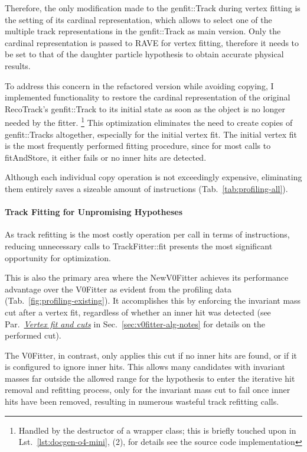 Therefore, the only modification made to the genfit::Track during vertex fitting is the setting of its cardinal representation, which allows to select one of the multiple track representations in the genfit::Track as main version.
Only the cardinal representation is passed to RAVE for vertex fitting, therefore it needs to be set to that of the daughter particle hypothesis to obtain accurate physical results.

To address this concern in the refactored version while avoiding copying, I implemented functionality to restore the cardinal representation of the original RecoTrack's genfit::Track to its initial state as soon as the object is no longer needed by the fitter.%
\footnote{
  Handled by the destructor of a wrapper class; this is briefly touched upon in Lst.\ \ref{lst:docgen-o4-mini}, (2), for details see the source code implementation
}
This optimization eliminates the need to create copies of genfit::Tracks altogether, especially for the initial vertex fit.
The initial vertex fit is the most frequently performed fitting procedure, since for most calls to fitAndStore, it either fails or no inner hits are detected.

Although each individual copy operation is not exceedingly expensive, eliminating them entirely saves a sizeable amount of instructions (Tab.\ \ref{tab:profiling-all}).

\paragraph{Track Fitting for Unpromising Hypotheses}
As track refitting is the most costly operation per call in terms of instructions, reducing unnecessary calls to TrackFitter::fit presents the most significant opportunity for optimization.

This is also the primary area where the NewV0Fitter achieves its performance advantage over the V0Fitter as evident from the profiling data (Tab.\ \ref{fig:profiling-existing}).
It accomplishes this by enforcing the invariant mass cut after a vertex fit, regardless of whether an inner hit was detected (see Par.\ \hyperref[par:vertex-cuts]{\emph{Vertex fit and cuts}} in Sec.\ \ref{sec:v0fitter-alg-notes} for details on the performed cut).

The V0Fitter, in contrast, only applies this cut if no inner hits are found, or if it is configured to ignore inner hits.
This allows many candidates with invariant masses far outside the allowed range for the hypothesis to enter the iterative hit removal and refitting process, only for the invariant mass cut to fail once inner hits have been removed, resulting in numerous wasteful track refitting calls.

